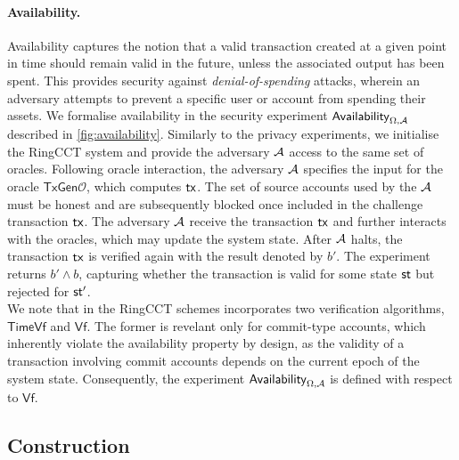 \paragraph*{Availability.} Availability captures the notion that a valid transaction created at a given point in time should remain valid in the future, unless the associated output has been spent. This provides security against \textit{denial-of-spending} attacks, wherein an adversary attempts to prevent a specific user or account from spending their assets.  We formalise availability in the security experiment $\mathsf{Availability}_{\Omega,\mathcal{A}}$ described in \cref{fig:availability}. Similarly to the privacy experiments, we initialise the RingCCT system and provide the adversary $\mathcal{A}$ access to the same set of oracles. Following oracle interaction, the adversary $\mathcal{A}$ specifies the input for the oracle $\mathsf{TxGen}\mathcal{O}$, which computes $\mathsf{tx}$. The set of source accounts used by the $\mathcal{A}$ must be honest and are subsequently blocked once included in the challenge transaction $\mathsf{tx}$. The adversary $\mathcal{A}$ receive the transaction $\mathsf{tx}$ and further interacts with the oracles, which may update the system state. After $\mathcal{A}$ halts, the transaction $\mathsf{tx}$ is verified again with the result denoted by $b'$. The experiment returns $b' \land b$, capturing whether the transaction is valid for some state $\st$ but rejected for $\st'$. \\
We note that in the RingCCT schemes incorporates two verification algorithms, $\mathsf{TimeVf}$ and $\mathsf{Vf}$. The former is revelant only for commit-type accounts, which inherently violate the availability property by design, as the validity of a transaction involving commit accounts depends on the current epoch of the system state. Consequently, the experiment $\mathsf{Availability}_{\Omega,\mathcal{A}}$ is defined with respect to $\mathsf{Vf}$.

\newpage

\subsection{Construction}

